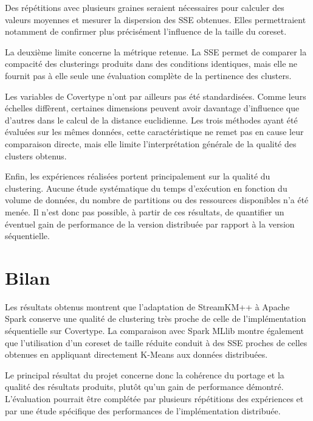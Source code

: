 Des répétitions avec plusieurs graines seraient nécessaires pour calculer des valeurs moyennes et mesurer la dispersion des SSE obtenues. Elles permettraient notamment de confirmer plus précisément l'influence de la taille du coreset.

La deuxième limite concerne la métrique retenue. La SSE permet de comparer la compacité des clusterings produits dans des conditions identiques, mais elle ne fournit pas à elle seule une évaluation complète de la pertinence des clusters.

Les variables de Covertype n'ont par ailleurs pas été standardisées. Comme leurs échelles diffèrent, certaines dimensions peuvent avoir davantage d'influence que d'autres dans le calcul de la distance euclidienne. Les trois méthodes ayant été évaluées sur les mêmes données, cette caractéristique ne remet pas en cause leur comparaison directe, mais elle limite l'interprétation générale de la qualité des clusters obtenus.

Enfin, les expériences réalisées portent principalement sur la qualité du clustering. Aucune étude systématique du temps d'exécution en fonction du volume de données, du nombre de partitions ou des ressources disponibles n'a été menée. Il n'est donc pas possible, à partir de ces résultats, de quantifier un éventuel gain de performance de la version distribuée par rapport à la version séquentielle.

\section{Bilan}

Les résultats obtenus montrent que l'adaptation de StreamKM++ à Apache Spark conserve une qualité de clustering très proche de celle de l'implémentation séquentielle sur Covertype. La comparaison avec Spark MLlib montre également que l'utilisation d'un coreset de taille réduite conduit à des SSE proches de celles obtenues en appliquant directement K-Means aux données distribuées.

Le principal résultat du projet concerne donc la cohérence du portage et la qualité des résultats produits, plutôt qu'un gain de performance démontré. L'évaluation pourrait être complétée par plusieurs répétitions des expériences et par une étude spécifique des performances de l'implémentation distribuée.
